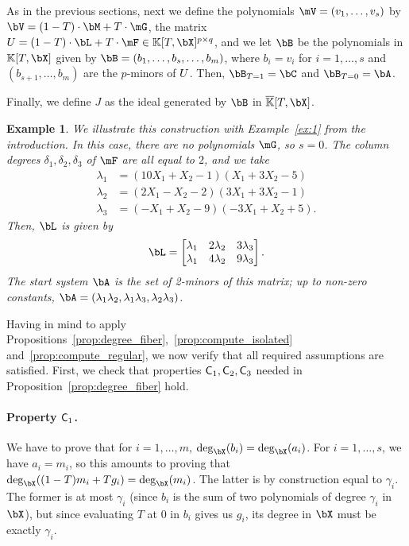 \documentclass[12pt]{article}
\newtheorem{example}[definition]{Example}
\begin{document}
As in the previous sections, next we define the polynomials
$\mV=(v_1,\dots,v_s)$ by $\bV = (1-T) \cdot \bM + T \cdot \mG$, the
matrix $\mU=(1-T)\cdot \bL + T \cdot \mF \in \KK[T,\bX]^{p\times q}$,
and we let $\bB$ be the polynomials in $\KK[T,\bX]$ given by
$\bB=(b_1,\dots,b_s,\dots,b_m)$, where $b_i=v_i$ for $i=1,\dots,s$ and
$(b_{s+1},\dots,b_{m})$ are the $p$-minors of ${U}$.  Then, $\bB_{T=1}=\bC$ and $\bB_{T=0}=\bA$.

Finally, we define $J$ as the ideal generated by $\bB$ in
$\KKbar[T,\bX]$.
\begin{example}\label{ex:coldeg}
  We illustrate this construction with Example~\ref{ex:1} from the
  introduction. In this case, there are no polynomials $\mG$, so
  $s=0$. The column degrees $\delta_1,\delta_2,\delta_3$ of $\mF$
  are all equal to $2$, and we take
  \begin{align*}
    \lambda_1 &= (10X_1+X_2-1)(X_1+3X_2-5)\\
    \lambda_2 &= (2X_1-X_2-2)(3X_1+3X_2-1)\\
    \lambda_3 &= (-X_1+X_2-9)(-3X_1+X_2+5).
  \end{align*}
Then, $\bL$ is given by
\[\bL=\begin{bmatrix} 
\lambda_1 & 2 \lambda_2 & 3\lambda_3 \\
\lambda_1 & 4 \lambda_2 & 9\lambda_3 
\end{bmatrix}.\]
The start system $\bA$ is the set of 2-minors of this matrix;
up to non-zero constants, $\bA=(\lambda_1\lambda_2, \lambda_1\lambda_3, \lambda_2\lambda_3)$.
\end{example}




Having in mind to apply
Propositions~\ref{prop:degree_fiber},~\ref{prop:compute_isolated}
and~\ref{prop:compute_regular}, we now verify that all required
assumptions are satisfied. First, we check that properties
$\mathsf{C}_1,\mathsf{C}_2,\mathsf{C}_3$ needed in
Proposition~\ref{prop:degree_fiber} hold.

\paragraph{Property $\mathsf{C}_1$.} We have to prove that for $i=1,\dots,m$,
$\deg_\bX(b_i)=\deg_\bX(a_i)$. 
For $i=1,\dots,s$, we have $a_i=m_i$, so
this amounts to proving that $\deg_\bX((1-T) m_i +
T g_i)=\deg_\bX(m_i)$. The latter is by construction equal to
$\gamma_i$. The former is at most $\gamma_i$ (since $b_i$ is the sum
of two polynomials of degree $\gamma_i$ in $\bX$), but since
evaluating $T$ at $0$ in $b_i$ gives us $g_i$, its degree in $\bX$
must be exactly $\gamma_i$.
\end{document}
